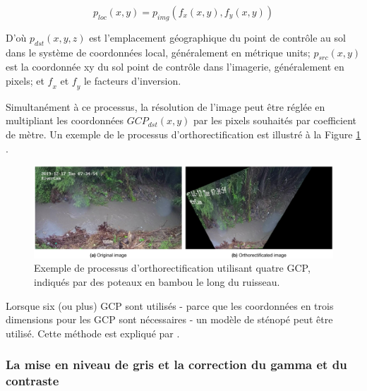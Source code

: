 \documentclass[
]{article}
\begin{document}
\begin{equation}
p_{loc}\left(x,y\right)=p_{img}\left(f_x\left(x,y\right), f_y\left(x,y\right)\right)
\label{eq:corr4}
\end{equation}

D'où \(𝑝_ {𝑑𝑠𝑡} \left (𝑥, 𝑦, 𝑧 \right)\) est l'emplacement géographique du
point de contrôle au sol dans le système de coordonnées local, généralement en métrique
units; \(𝑝_ {𝑠𝑟𝑐} \left (𝑥, 𝑦 \right)\) est la coordonnée xy du sol
point de contrôle dans l'imagerie, généralement en pixels; et \(𝑓_𝑥\) et \(𝑓_𝑦\) le
facteurs d'inversion.

Simultanément à ce processus, la résolution de l'image peut être réglée
en multipliant les coordonnées \(𝐺𝐶𝑃_ {𝑑𝑠𝑡} \left (𝑥, 𝑦 \right)\) par les
pixels souhaités par coefficient de mètre. Un exemple de
le processus d'orthorectification est illustré à la Figure \ref{fig:orthoafter} .



\begin{figure}
\includegraphics[width=1\linewidth]{images/ortho_after} \caption{Exemple de processus d'orthorectification utilisant quatre GCP, indiqués par des poteaux en bambou le long du ruisseau.}\label{fig:orthoafter}
\end{figure}

Lorsque six (ou plus) GCP sont utilisés - parce que les coordonnées en trois dimensions
pour les GCP sont nécessaires - un modèle de sténopé peut être utilisé. Cette méthode est
expliqué par \citep{jodeau_application_2008} .

\hypertarget{la-mise-en-niveau-de-gris-et-la-correction-du-gamma-et-du-contraste}{%
\subsubsection*{La mise en niveau de gris et la correction du gamma et du contraste}\label{la-mise-en-niveau-de-gris-et-la-correction-du-gamma-et-du-contraste}}
\end{document}
